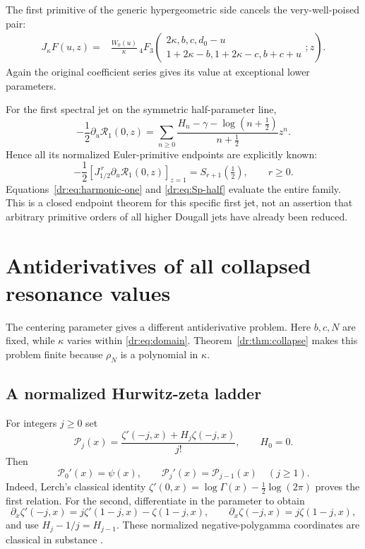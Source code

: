 \documentclass[11pt,letterpaper]{article}
\numberwithin{equation}{section}
\theoremstyle{definition}
\theoremstyle{remark}
\newcommand{\Rcal}{\mathcal R}
\newcommand{\Pcal}{\mathcal P}
\begin{document}
The first primitive of the generic hypergeometric side cancels the
very-well-poised pair:
\begin{align}
 J_\kappa F(u,z)={}&\frac{W_0(u)}\kappa\,
 {}_4F_3\!\left(\begin{matrix}2\kappa,b,c,d_0-u\\
 1+2\kappa-b,1+2\kappa-c,b+c+u\end{matrix};z\right).
 \label{dr:eq:4F3}
\end{align}
Again the original coefficient series gives its value at exceptional
lower parameters.

For the first spectral jet on the symmetric half-parameter line,
\begin{equation}
 -\frac12\partial_u\Rcal_1(0,z)
 =\sum_{n\geq0}\frac{H_n-\gamma-\log(n+\tfrac12)}{n+\tfrac12}z^n.
 \label{dr:eq:first-jet-generating}
\end{equation}
Hence all its normalized Euler-primitive endpoints are explicitly known:
\begin{equation}
 -\frac12\left[J_{1/2}^{\,r}\partial_u\Rcal_1(0,z)\right]_{z=1}
      =S_{r+1}(\tfrac12),\qquad r\geq0.
 \label{dr:eq:all-primitive-endpoints}
\end{equation}
Equations~\eqref{dr:eq:harmonic-one} and \eqref{dr:eq:Sp-half}
evaluate the entire family. This is a closed endpoint theorem for this
specific first jet, not an assertion that arbitrary primitive orders of
all higher Dougall jets have already been reduced.

\section{Antiderivatives of all collapsed resonance values}
\label{dr:sec:kappa-primitives}

The centering parameter gives a different antiderivative problem.
Here $b,c,N$ are fixed, while $\kappa$ varies within
\eqref{dr:eq:domain}. Theorem~\ref{dr:thm:collapse} makes this problem
finite because $\rho_N$ is a polynomial in $\kappa$.

\subsection{A normalized Hurwitz-zeta ladder}

For integers $j\geq0$ set
\begin{equation}
 \Pcal_j(x)=\frac{\zeta'(-j,x)+H_j\zeta(-j,x)}{j!},
 \qquad H_0=0.
 \label{dr:eq:Pj}
\end{equation}
Then
\begin{equation}
 \Pcal_0'(x)=\psi(x),\qquad
 \Pcal_j'(x)=\Pcal_{j-1}(x)\quad(j\geq1).
 \label{dr:eq:P-ladder}
\end{equation}
Indeed, Lerch's classical identity
$\zeta'(0,x)=\log\Gamma(x)-\tfrac12\log(2\pi)$ proves the first
relation. For the second, differentiate in the parameter to obtain
\[
 \partial_x\zeta'(-j,x)=j\zeta'(1-j,x)-\zeta(1-j,x),
 \qquad \partial_x\zeta(-j,x)=j\zeta(1-j,x),
\]
and use $H_j-1/j=H_{j-1}$. These normalized negative-polygamma
coordinates are classical in substance \cite{espinosa,dlmf-hurwitz}.
\end{document}

